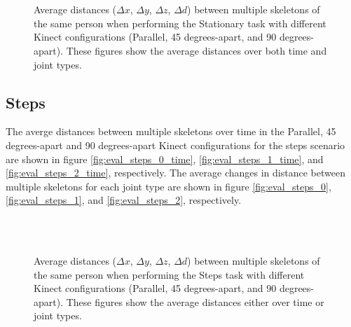 \documentclass{sigchi}
\begin{document}
\begin{figure}
  \centering

   \\
   \\
  

  \caption{Average distances ($\Delta x$, $\Delta y$, $\Delta z$, $\Delta d$) between multiple skeletons
    of the same person when performing the Stationary task with different Kinect configurations
    (Parallel, 45 degrees-apart, and 90 degrees-apart). These figures show the average distances over both
    time and joint types.}

  \label{fig:results_stationary_3d}
\end{figure}

\subsection{Steps}

The averge distances between multiple skeletons over time in the Parallel, 45 degrees-apart and 90 degrees-apart Kinect configurations for the steps scenario are shown in figure \ref{fig:eval_steps_0_time}, \ref{fig:eval_steps_1_time}, and \ref{fig:eval_steps_2_time}, respectively. The average changes in distance between multiple skeletons for each joint type are shown in figure \ref{fig:eval_steps_0}, \ref{fig:eval_steps_1}, and \ref{fig:eval_steps_2}, respectively.


\begin{figure}
  \centering

  
   \\
  
   \\
  
  

  \caption{Average distances ($\Delta x$, $\Delta y$, $\Delta z$, $\Delta d$) between multiple skeletons
    of the same person when performing the Steps task with different Kinect configurations
    (Parallel, 45 degrees-apart, and 90 degrees-apart). These figures show the average distances either
    over time or joint types.}

  \label{fig:results_steps}
\end{figure}
\end{document}
